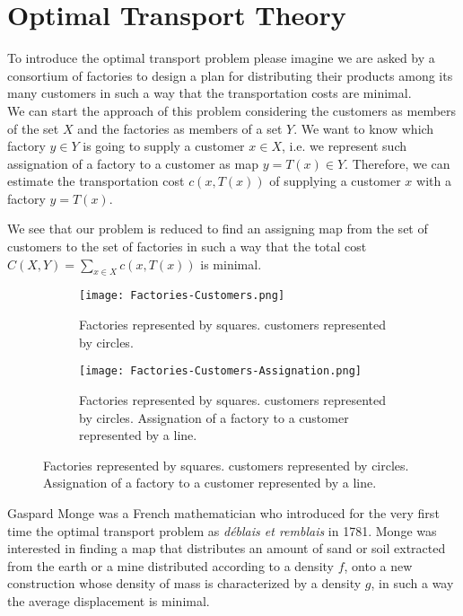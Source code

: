\chapter{Optimal Transport Theory}

To introduce the optimal transport problem please imagine we are asked by a consortium of factories to design a plan for distributing their products among its many customers in such a way that the transportation costs are minimal. \\


We can start the approach of this problem considering the customers as members of the set $X$ and the factories as members of a set $Y$. We want to know which factory $y\in Y$ is going to supply a customer $x\in X$, i.e. we represent such assignation of a factory to a customer as map $y=T(x)\in Y$. Therefore, we can estimate the transportation cost $c(x, T(x))$ of supplying a customer $x$ with a factory $y=T(x)$. 

We see that our problem is reduced to find an assigning map from the set of customers to the set of factories in such a way that the total cost $C(X, Y)=\sum_{x\in X} c(x, T(x))$ is minimal.  
\\
\begin{figure}[H]
	\centering
	\caption{Illustration of the problem of Factories supplying customers.}
	\begin{subfigure}[t]{0.4\textwidth}
		\texttt{[image: Factories-Customers.png]}
		\caption{Factories represented by squares. customers represented by circles.}
	\end{subfigure}
	\hfil
	\begin{subfigure}[t]{0.4\textwidth}
		\texttt{[image: Factories-Customers-Assignation.png]}
		\caption{Factories represented by squares. customers represented by circles. Assignation of a factory to a customer represented by a line.}
	\end{subfigure}	
\end{figure}

Gaspard Monge was a French mathematician who introduced for the very first time the optimal transport problem as \textit{d\'eblais et remblais} in 1781. Monge was interested in finding a map that distributes an amount of sand or soil extracted from the earth or a mine distributed according to a density $f$, onto a new construction whose density of mass is characterized by a density $g$, in such a way the average displacement is minimal. 


